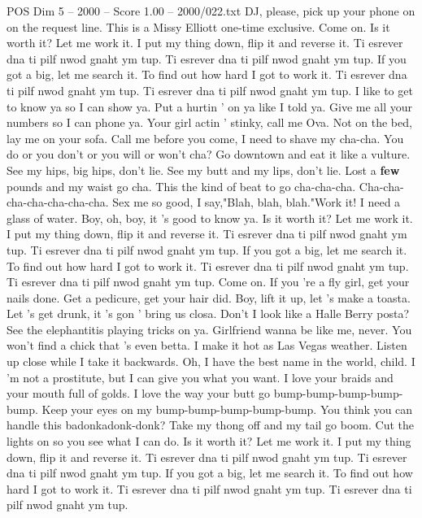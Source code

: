 \begin{textsample}{POS Dim 5 – 2000 – Score 1.00 – 2000/022.txt}  \label{ex:f5_pos_004}
DJ, please, pick up your phone on on the request line.
This is a Missy Elliott one-time exclusive.
Come on.
Is it worth it?
Let me work it.
I put my thing down, flip it and reverse it.
Ti esrever dna ti pilf nwod gnaht ym tup.
Ti esrever dna ti pilf nwod gnaht ym tup.
If you got a big, let me search it.
To find out how hard I got to work it.
Ti esrever dna ti pilf nwod gnaht ym tup.
Ti esrever dna ti pilf nwod gnaht ym tup.
I like to get to know ya so I can show ya.
Put a hurtin ' on ya like I told ya.
Give me all your numbers so I can phone ya.
Your girl actin ' stinky, call me Ova.
Not on the bed, lay me on your sofa.
Call me before you come, I need to shave my cha-cha.
You do or you don't or you will or won't cha?
Go downtown and eat it like a vulture.
See my hips, big hips, don't lie.
See my butt and my lips, don't lie.
Lost a \textbf{few} pounds and my waist go cha.
This the kind of beat to go cha-cha-cha.
Cha-cha-cha-cha-cha-cha-cha.
Sex me so good, I say,"Blah, blah, blah."Work it!
I need a glass of water.
Boy, oh, boy, it 's good to know ya.
Is it worth it?
Let me work it.
I put my thing down, flip it and reverse it.
Ti esrever dna ti pilf nwod gnaht ym tup.
Ti esrever dna ti pilf nwod gnaht ym tup.
If you got a big, let me search it.
To find out how hard I got to work it.
Ti esrever dna ti pilf nwod gnaht ym tup.
Ti esrever dna ti pilf nwod gnaht ym tup.
Come on.
If you 're a fly girl, get your nails done.
Get a pedicure, get your hair did.
Boy, lift it up, let 's make a toasta.
Let 's get drunk, it 's gon ' bring us closa.
Don't I look like a Halle Berry posta?
See the elephantitis playing tricks on ya.
Girlfriend wanna be like me, never.
You won't find a chick that 's even betta.
I make it hot as Las Vegas weather.
Listen up close while I take it backwards.
Oh, I have the best name in the world, child.
I 'm not a prostitute, but I can give you what you want.
I love your braids and your mouth full of golds.
I love the way your butt go bump-bump-bump-bump-bump.
Keep your eyes on my bump-bump-bump-bump-bump.
You think you can handle this badonkadonk-donk?
Take my thong off and my tail go boom.
Cut the lights on so you see what I can do.
Is it worth it?
Let me work it.
I put my thing down, flip it and reverse it.
Ti esrever dna ti pilf nwod gnaht ym tup.
Ti esrever dna ti pilf nwod gnaht ym tup.
If you got a big, let me search it.
To find out how hard I got to work it.
Ti esrever dna ti pilf nwod gnaht ym tup.
Ti esrever dna ti pilf nwod gnaht ym tup.

\end{textsample}
